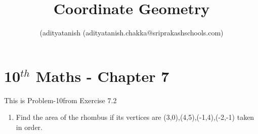\documentclass[12pt]{article}
\title{Coordinate Geometry}
\author{ (adityatanish (adityatanish.chakka@sriprakashschools.com)}
\begin{document}
\maketitle
\section*{10$^{th}$ Maths - Chapter 7}
This is Problem-10from Exercise 7.2
\begin{enumerate}
\item Find the area of the rhombus if its vertices are (3,0),(4,5),(-1,4),(-2,-1) taken in order.\\

\end{enumerate} 
\end{document}

